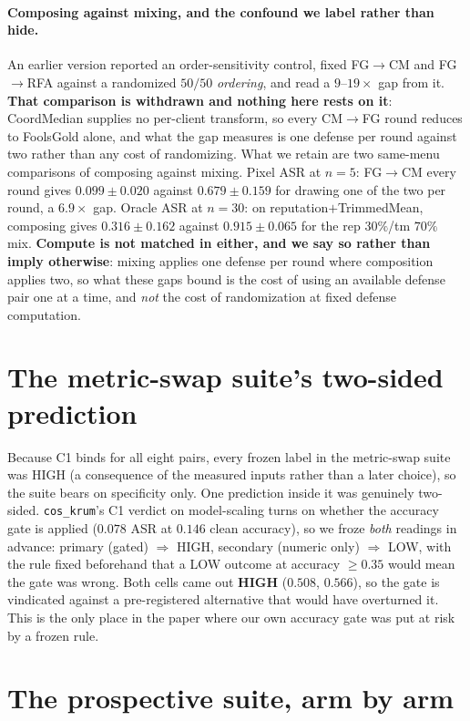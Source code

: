 \documentclass{article}
\begin{document}
\paragraph{Composing against mixing, and the confound we label rather than hide.} An earlier version reported an order-sensitivity control, fixed FG$\to$CM and FG$\to$RFA against a randomized $50/50$ \emph{ordering}, and read a $9$--$19\times$ gap from it. \textbf{That comparison is withdrawn and nothing here rests on it}: CoordMedian supplies no per-client transform, so every CM$\to$FG round reduces to FoolsGold alone, and what the gap measures is one defense per round against two rather than any cost of randomizing. What we retain are two same-menu comparisons of composing against mixing. Pixel ASR at $n{=}5$: FG$\to$CM every round gives $0.099 \pm 0.020$ against $0.679 \pm 0.159$ for drawing one of the two per round, a $6.9\times$ gap. Oracle ASR at $n{=}30$: on reputation$+$TrimmedMean, composing gives $0.316 \pm 0.162$ against $0.915 \pm 0.065$ for the rep $30\%$/tm $70\%$ mix. \textbf{Compute is not matched in either, and we say so rather than imply otherwise}: mixing applies one defense per round where composition applies two, so what these gaps bound is the cost of using an available defense pair one at a time, and \emph{not} the cost of randomization at fixed defense computation.

\section{The metric-swap suite's two-sided prediction}
\label{app:gate_prediction}

Because C1 binds for all eight pairs, every frozen label in the metric-swap suite was HIGH (a consequence of the measured inputs rather than a later choice), so the suite bears on specificity only. One prediction inside it was genuinely two-sided. \texttt{cos\_krum}'s C1 verdict on model-scaling turns on whether the accuracy gate is applied ($0.078$ ASR at $0.146$ clean accuracy), so we froze \emph{both} readings in advance: primary (gated) $\Rightarrow$ HIGH, secondary (numeric only) $\Rightarrow$ LOW, with the rule fixed beforehand that a LOW outcome at accuracy $\ge 0.35$ would mean the gate was wrong. Both cells came out \textbf{HIGH} ($0.508$, $0.566$), so the gate is vindicated against a pre-registered alternative that would have overturned it. This is the only place in the paper where our own accuracy gate was put at risk by a frozen rule.

\section{The prospective suite, arm by arm}
\label{app:prospective}
\end{document}
